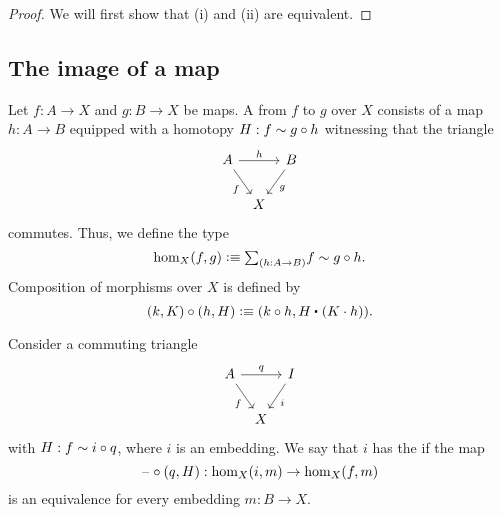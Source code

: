 \begin{proof}
  We will first show that (i) and (ii) are equivalent. 
\end{proof}

\subsection{The image of a map}\label{sec:image-construction}

\begin{defn}
  Let $f:A\to X$ and $g:B\to X$ be maps. A  from $f$ to $g$ over $X$ consists of a map $h:A\to B$ equipped with a homotopy $H:f\sim g\circ h$ witnessing that the triangle
\begin{equation*}
\begin{tikzcd}[column sep=tiny]
A \arrow[rr,"h"] \arrow[dr,swap,"f"] & & B \arrow[dl,"g"] \\
& X
\end{tikzcd}
\end{equation*}
commutes. Thus, we define the type
\begin{equation*}
\mathrm{hom}_X(f,g)\defeq\sm{h:A\to B}f\htpy g\circ h.
\end{equation*}
Composition of morphisms over $X$ is defined by
\begin{equation*}
  (k,K)\circ (h,H) \defeq (k\circ h,\ct{H}{(K\cdot h)}).
\end{equation*}
\end{defn}

\begin{defn}
Consider a commuting triangle
\begin{equation*}
\begin{tikzcd}[column sep=tiny]
A \arrow[rr,"q"] \arrow[dr,swap,"f"] & & I \arrow[dl,"i"] \\
& X
\end{tikzcd}
\end{equation*}
with $H:f\sim i\circ q$, where $i$ is an embedding.
We say that $i$ has the  if the map
\begin{equation*}
\mathord{\hspace{1pt}\text{--}\hspace{1pt}}\circ(q,H) : \mathrm{hom}_X(i,m)\to\mathrm{hom}_X(f,m)
\end{equation*}
is an equivalence for every embedding $m:B\to X$. 
\end{defn}

